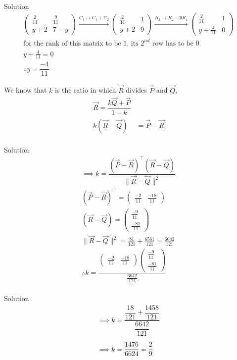 \documentclass{beamer}
\providecommand{\brak}[1]{\ensuremath{\left(#1\right)}}
\theoremstyle{remark}
\providecommand{\norm}[1]{\lVert#1\rVert}
\newcommand{\myvec}[1]{\ensuremath{\begin{pmatrix}#1\end{pmatrix}}}
\begin{document}
\begin{frame}{Solution}
\begin{align*}
 \myvec{\frac{2}{11}&\frac{9}{11}\\ y+2&7-y} \overset{C_1 \rightarrow C_1+C_2}{\longrightarrow} \myvec{\frac{2}{11} &1 \\ y+2 & 9} \overset{R_2 \rightarrow R_2-9 R_1}{\longrightarrow} \myvec{\frac{2}{11}&1\\ y+\frac{4}{11} & 0}\\
    \text{for the rank of this matrix to be 1, its $2^{nd}$ row has to be 0}\\ y+\frac{4}{11}=0\\
    \therefore y=\dfrac{-4}{11}  
\end{align*}

We know that $k$ is the ratio in which $\vec{R}$ divides $\vec{P}$ and $\vec{Q}$,
\begin{align*}
    \vec{R}=\dfrac{k\vec{Q}+\vec{P}}{1+k}\\
   k\brak{\vec{R}-\vec{Q}}&= \vec{P}-\vec{R}\\
\end{align*}
\end{frame}

\begin{frame}{Solution}
   \begin{align*}
    \implies k =\dfrac{\brak{\vec{P}-\vec{R}}^{\top}\brak{\vec{R}-\vec{Q}}}{\norm{\vec{R}-\vec{Q}}^2}\\
   \brak{\vec{P}-\vec{R}}^{\top}=\myvec{\frac{-2}{11} & \frac{-18}{11}}\\
   \brak{\vec{R}-\vec{Q}}=\myvec{\frac{-9}{11} \\ \frac{-81}{11}}\\
   \norm{\vec{R}-\vec{Q}}^2=\frac{81}{121} + \frac{6561}{121}=\frac{6642}{121}\\
   \therefore k=\dfrac{\myvec{\frac{-2}{11} & \frac{-18}{11}}\myvec{\frac{-9}{11} \\ \frac{-81}{11}}}{\frac{6642}{121}}\\
   \end{align*}


\end{frame}
\begin{frame}{Solution}
    \begin{align*}
        \implies k=\dfrac{\dfrac{18}{121} + \dfrac{1458}{121}}{\dfrac{6642}{121}}\\ \\ 
   \implies k=\dfrac{1476}{6624}=\dfrac{2}{9}
    \end{align*}
\end{frame}
\end{document}
